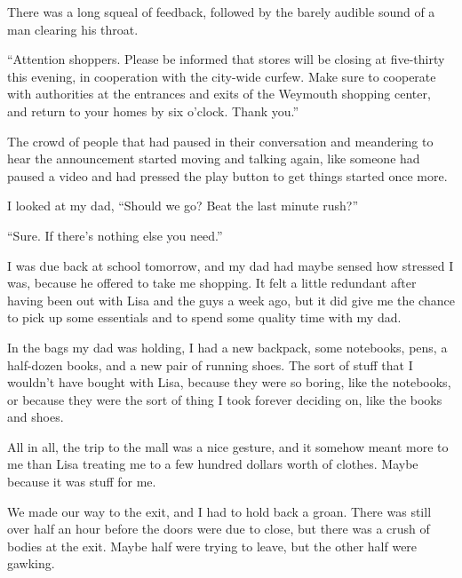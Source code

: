 





There was a long squeal of feedback, followed by the barely audible sound of a man clearing his throat.



``Attention shoppers.  Please be informed that stores will be closing at five-thirty this evening, in cooperation with the city-wide curfew.  Make sure to cooperate with authorities at the entrances and exits of the Weymouth shopping center, and return to your homes by six o'clock.  Thank you.''



The crowd of people that had paused in their conversation and meandering to hear the announcement started moving and talking again, like someone had paused a video and had pressed the play button to get things started once more.



I looked at my dad, ``Should we go?  Beat the last minute rush?''



``Sure.  If there's nothing else you need.''



I was due back at school tomorrow, and my dad had maybe sensed how stressed I was, because he offered to take me shopping.  It felt a little redundant after having been out with Lisa and the guys a week ago, but it did give me the chance to pick up some essentials and to spend some quality time with my dad.



In the bags my dad was holding, I had a new backpack, some notebooks, pens, a half-dozen books, and a new pair of running shoes.  The sort of stuff that I wouldn't have bought with Lisa, because they were so boring, like the notebooks, or because they were the sort of thing I took forever deciding on, like the books and shoes.



All in all, the trip to the mall was a nice gesture, and it somehow meant more to me than Lisa treating me to a few hundred dollars worth of clothes.  Maybe because it was stuff for me.



We made our way to the exit, and I had to hold back a groan.  There was still over half an hour before the doors were due to close, but there was a crush of bodies at the exit.  Maybe half were trying to leave, but the other half were gawking.



